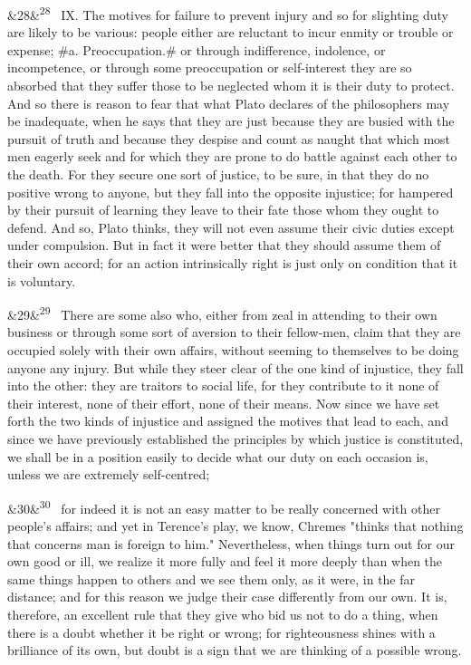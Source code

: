 \documentclass[12pt]{article}
\newcommand{\para}[1][]{\par\noindent\ifx&#1&\else\textsuperscript{\footnotesize #1}~\fi}
\begin{document}
\para[28] IX. The motives for failure to prevent injury and so for slighting duty are likely to be various: people either are reluctant to incur enmity or trouble or expense; \#a. Preoccupation.\# or through indifference, indolence, or incompetence, or through some preoccupation or self-interest they are so absorbed that they suffer those to be neglected whom it is their duty to protect. And so there is reason to fear that what Plato declares of the philosophers may be inadequate, when he says that they are just because they are busied with the pursuit of truth and because they despise and count as naught that which most men eagerly seek and for which they are prone to do battle against each other to the death. For they secure one sort of justice, to be sure, in that they do no positive wrong to anyone, but they fall into the opposite injustice; for hampered by their pursuit of learning they leave to their fate those whom they ought to defend. And so, Plato thinks, they will not even assume their civic duties except under compulsion. But in fact it were better that they should assume them of their own accord; for an action intrinsically right is just only on condition that it is voluntary.

\para[29] There are some also who, either from zeal in attending to their own business or through some sort of aversion to their fellow-men, claim that they are occupied solely with their own affairs, without seeming to themselves to be doing anyone any injury. But while they steer clear of the one kind of injustice, they fall into the other: they are traitors to social life, for they contribute to it none of their interest, none of their effort, none of their means. Now since we have set forth the two kinds of injustice and assigned the motives that lead to each, and since we have previously established the principles by which justice is constituted, we shall be in a position easily to decide what our duty on each occasion is, unless we are extremely self-centred;

\para[30] for indeed it is not an easy matter to be really concerned with other people's affairs; and yet in Terence's play, we know, Chremes "thinks that nothing that concerns man is foreign to him." Nevertheless, when things turn out for our own good or ill, we realize it more fully and feel it more deeply than when the same things happen to others and we see them only, as it were, in the far distance; and for this reason we judge their case differently from our own. It is, therefore, an excellent rule that they give who bid us not to do a thing, when there is a doubt whether it be right or wrong; for righteousness shines with a brilliance of its own, but doubt is a sign that we are thinking of a possible wrong.
\end{document}
